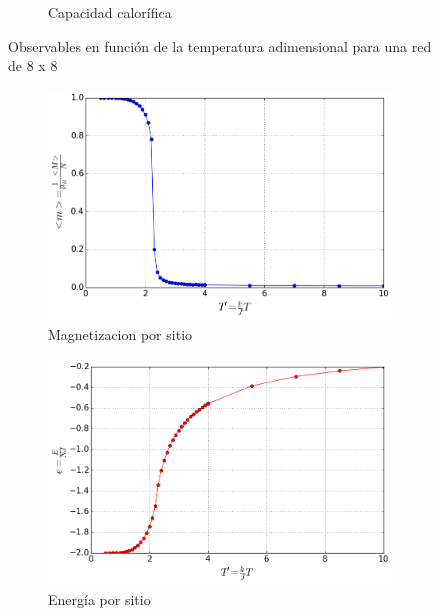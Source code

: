 \documentclass[12pt,a4paper]{article}
\begin{document}
\begin{figure}[H]
\begin{subfigure}[c]{0.45\textwidth}
\caption{Capacidad calorífica}
\label{fig:c_L_8}
\end{subfigure}
\caption{Observables en función de la temperatura adimensional para una red de 8 x 8}
\label{fig:obs_L_8}
\end{figure}


\begin{figure}[H]
\begin{subfigure}[c]{0.45\textwidth}
\centering
\includegraphics[width=\textwidth]{observables/mag_L_128.png}
\caption{Magnetizacion por sitio}
\label{fig:mag_L_128}
\end{subfigure}
\begin{subfigure}[c]{0.45\textwidth}
\centering
\includegraphics[width=\textwidth]{observables/e_L_128.png}
\caption{Energía por sitio}
\label{fig:e_L_128}
\end{subfigure}
\\
\centering
\begin{subfigure}[c]{0.4\textwidth}

\end{subfigure}
\end{figure}
\end{document}

